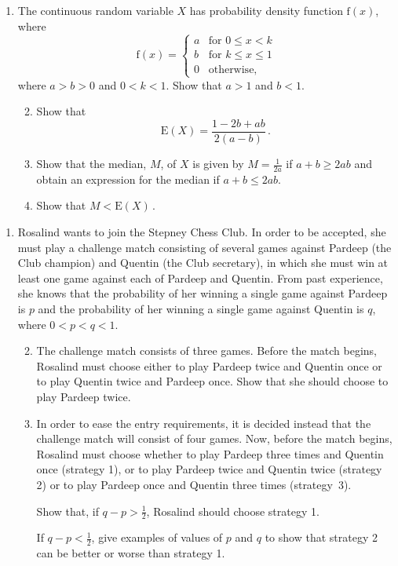 \documentclass[a4, 11pt]{report}
\newlength{\qspace}
\newcounter{qnumber}
\newenvironment{question}%
 {\vspace{\qspace}
  \begin{enumerate}[\bfseries 1\quad][10]%
    \setcounter{enumi}{\value{qnumber}}%
    \item%
 }
{
  \end{enumerate}
  \filbreak
  \stepcounter{qnumber}
 }
\newenvironment{questionparts}[1][1]%
 {
  \begin{enumerate}[\bfseries (i)]%
    \setcounter{enumii}{#1}
    \addtocounter{enumii}{-1}
    \setlength{\itemsep}{5mm}
    \setlength{\parskip}{8pt}
 }
 {
  \end{enumerate}
 }
\def\f{{\mathrm f}}
\def\E{{\mathrm E}}
\def\le{\leqslant}
\def\ge{\geqslant}
\begin{document}
\begin{question}
The continuous random variable $X$ has probability density 
function $\f(x)$, where
\[
\f(x) = 
\begin{cases}
a & \text {for } 0\le x < k \\
b & \text{for } k \le x \le 1\\
0 & \text{otherwise},
\end{cases}
\]
where $a>b>0$ and $0<k<1$. Show that $a>1$ and $b<1$. 
\begin{questionparts}
\item Show that 
\[
\E(X) = \frac{1-2b+ab}{2(a-b)}\,.
\]
\item
Show that the median, $M$, of $X$ is given by 
$\displaystyle M=\frac 1 {2a}$ if
$a+b\ge 2ab$ and obtain an expression for the median if
$a+b\le 2ab$.
\item Show that $M<   \E(X)\,$.
\end{questionparts}
\end{question}

\begin{question}
Rosalind wants to join the Stepney Chess Club. In order to 
be accepted, she must play a challenge match consisting of several
games against 
Pardeep (the Club champion)
and Quentin (the Club secretary), in which she must win at least one
game against each of Pardeep and Quentin.
From past experience, she knows that
the probability of her winning a single game against 
Pardeep is $p$ and the probability of her 
winning a single game against Quentin is $q$,
where $0<p<q<1$.

\begin{questionparts}
\item
The challenge match consists of three games.
Before the match begins, Rosalind must choose either to 
play Pardeep twice and Quentin once or to play Quentin twice and
Pardeep once.
Show that she should choose  to play Pardeep twice. 

\item
In order to ease the entry requirements,
it is decided instead that the  challenge match will consist of 
four games. 
Now, before the match begins,
Rosalind must choose  whether to play Pardeep three times and 
Quentin once 
(strategy 1), or
to play Pardeep twice and Quentin twice (strategy 2) 
or to play  Pardeep once and Quentin three times (strategy~3).

Show that, if $q-p>\frac 12$, Rosalind should choose strategy 1.

If $q-p<\frac12$, give examples of values of $p$ and $q$ to show
that strategy 2 can be better or worse than strategy 1.
\end{questionparts}
\end{question}
\end{document}
